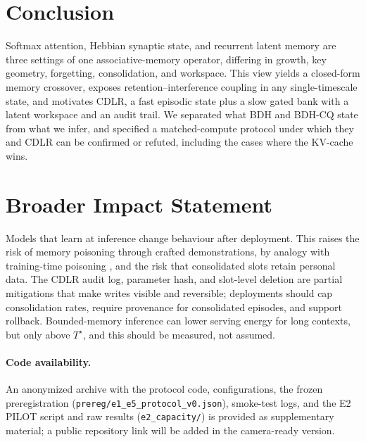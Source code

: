 \documentclass[10pt]{article}
\theoremstyle{remark}
\newcommand{\cdlr}{\textsc{CDLR}}
\begin{document}
\section{Conclusion}
\label{sec:conclusion}

Softmax attention, Hebbian synaptic state, and recurrent latent memory are three settings of one associative-memory
operator, differing in growth, key geometry, forgetting, consolidation, and workspace. This view yields a closed-form
memory crossover, exposes retention--interference coupling in any single-timescale state, and motivates \cdlr, a fast
episodic state plus a slow gated bank with a latent workspace and an audit trail. We separated what BDH and BDH-CQ
state from what we infer, and specified a matched-compute protocol under which they and \cdlr{} can be confirmed or
refuted, including the cases where the KV-cache wins.

\section*{Broader Impact Statement}
Models that learn at inference change behaviour after deployment. This raises the risk of memory poisoning through
crafted demonstrations, by analogy with training-time poisoning \citep{wallace2021poisoning}, and the risk that
consolidated slots retain personal data. The \cdlr{} audit log, parameter hash, and slot-level deletion are partial
mitigations that make writes visible and reversible; deployments should cap consolidation rates, require provenance
for consolidated episodes, and support rollback. Bounded-memory inference can lower serving energy for long contexts,
but only above $T^\star$, and this should be measured, not assumed.

\paragraph{Code availability.} An anonymized archive with the protocol code, configurations, the frozen
preregistration (\texttt{prereg/e1\_e5\_protocol\_v0.json}), smoke-test logs, and the E2 PILOT script and raw
results (\texttt{e2\_capacity/}) is provided as supplementary
material; a public repository link will be added in the camera-ready version.




\appendix
\end{document}
